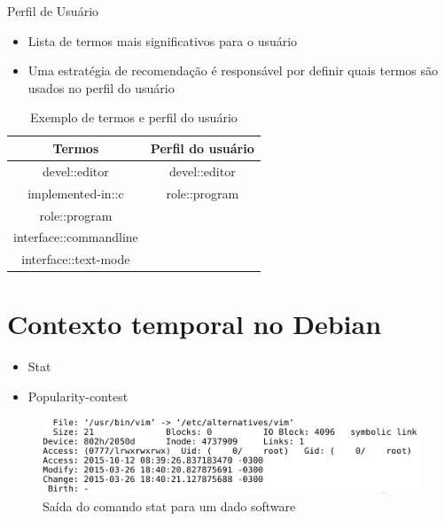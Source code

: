\begin{frame}
    Perfil de Usuário
    \begin{itemize}
        \item Lista de termos mais significativos para o usuário
        \item Uma estratégia de recomendação é responsável por definir quais termos
        são usados no perfil do usuário
    \end{itemize}

    \begin{table}[h]
    \centering
    \begin{tabular}{cc}
    \hline
    \rowcolor[HTML]{EFEFEF}
    {Termos} & {Perfil do usuário} \\ \hline
    {devel::editor} & {devel::editor} \\ \hline
    {implemented-in::c} & {role::program} \\ \hline
    {role::program} & {} \\ \hline
    {interface::commandline} & {} \\ \hline
    {interface::text-mode} & {} \\ \hline
    \end{tabular}
    \caption{Exemplo de termos e perfil do usuário}
    \label{tab:classificacao_pacotes}
    \end{table}
\end{frame}

\section{Contexto temporal no Debian} %
\label{sec:d}

\begin{frame}

    \begin{itemize}
        \item Stat
        \item Popularity-contest
    \end{itemize}

\end{frame}

\begin{frame}
\begin{figure}[h!]
    \centering
    \includegraphics[width=1\textwidth]{figura/comando_stat.eps}
    \caption{Saída do comando stat para um dado software}
\end{figure}
\end{frame}



